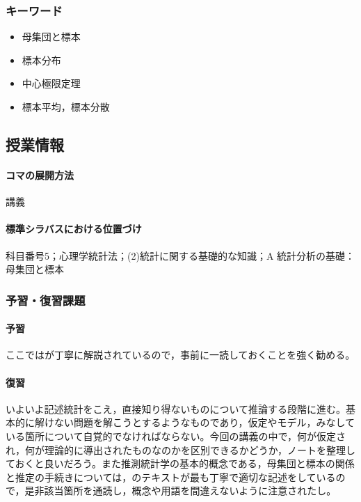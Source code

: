 \subsubsection{キーワード}
\begin{itemize}
	\item 母集団と標本
	\item 標本分布
	\item 中心極限定理
	\item 標本平均，標本分散
\end{itemize}
\subsection{授業情報}
\paragraph{コマの展開方法}
講義
\paragraph{標準シラバスにおける位置づけ}
科目番号5；心理学統計法；(2)統計に関する基礎的な知識；A 統計分析の基礎：母集団と標本
\subsubsection{予習・復習課題}
\paragraph{予習}
ここでは\textcite{Yamada2004}が丁寧に解説されているので，事前に一読しておくことを強く勧める。
\paragraph{復習}
いよいよ記述統計をこえ，直接知り得ないものについて推論する段階に進む。基本的に解けない問題を解こうとするようなものであり，仮定やモデル，みなしている箇所について自覚的でなければならない。今回の講義の中で，何が仮定され，何が理論的に導出されたものなのかを区別できるかどうか，ノートを整理しておくと良いだろう。また推測統計学の基本的概念である，母集団と標本の関係と推定の手続きについては，\textcite{Yamada2004}のテキストが最も丁寧で適切な記述をしているので，是非該当箇所を通読し，概念や用語を間違えないように注意されたし。
